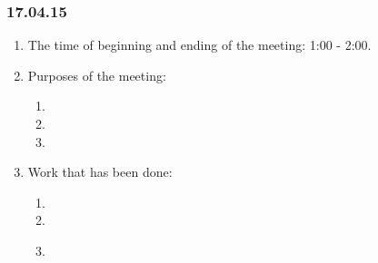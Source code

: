 \subsubsection{17.04.15}
\begin{enumerate}
	
	\item The time of beginning and ending of the meeting: 1:00 - 2:00.
	
	\item Purposes of the meeting: 
	\begin{enumerate}
		
		\item 
		
		\item 
		
        \item 
		
	\end{enumerate}

	\item Work that has been done:
	\begin{enumerate}
		
		\item 
		
		\item 
		
        \item 
		
        \begin{figure}[H]
	  	  \begin{minipage}[h]{0.2\linewidth}
	  	    \center  
	  	  \end{minipage}
	  	  \begin{minipage}[h]{0.6\linewidth}
	  		\caption{}
	  	  \end{minipage}
	   \end{figure}


\end{enumerate}
\end{enumerate}
